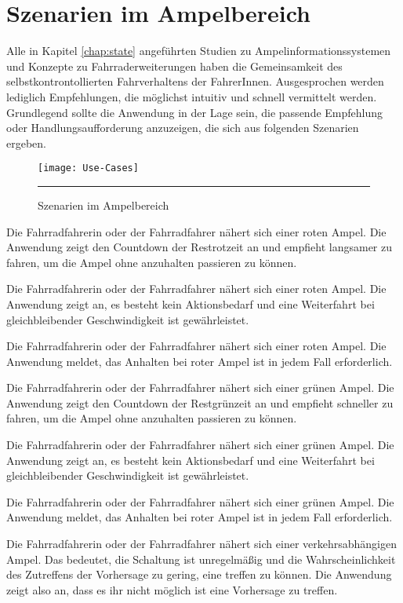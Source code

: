 \chapter{\label{chap:szenarien}Szenarien im Ampelbereich}
Alle in Kapitel \ref{chap:state} angeführten Studien zu Ampelinformationssystemen und Konzepte zu Fahrraderweiterungen haben die Gemeinsamkeit des selbstkontrontollierten Fahrverhaltens der FahrerInnen. Ausgesprochen werden lediglich Empfehlungen, die möglichst intuitiv und schnell vermittelt werden. Grundlegend sollte die Anwendung in der Lage sein, die passende Empfehlung oder Handlungsaufforderung anzuzeigen, die sich aus folgenden Szenarien ergeben.
\begin{figure}[H]  
    \centering  
    \texttt{[image: Use-Cases]} 
    \rule{35em}{0.5pt}
    \caption[Szenarien]{Szenarien im Ampelbereich}
    \label{fig:szenarien}
\end{figure}
\begin{description}[leftmargin=0.7cm,style=nextline]
\item[Szenario R1:] 
Die Fahrradfahrerin oder der Fahrradfahrer nähert sich einer roten Ampel. Die Anwendung zeigt den Countdown der Restrotzeit an und empfieht langsamer zu fahren, um die Ampel ohne anzuhalten passieren zu können.  \\
\item[Szenario R2:] 
Die Fahrradfahrerin oder der Fahrradfahrer nähert sich einer roten Ampel. Die Anwendung zeigt an, es besteht kein Aktionsbedarf und eine Weiterfahrt bei gleichbleibender Geschwindigkeit ist gewährleistet. \\
\item[Szenario R3:] 
Die Fahrradfahrerin oder der Fahrradfahrer nähert sich einer roten Ampel. Die Anwendung meldet, das Anhalten bei roter Ampel ist in jedem Fall erforderlich.\\
\item[Szenario G1:] 
Die Fahrradfahrerin oder der Fahrradfahrer nähert sich einer grünen Ampel. Die Anwendung zeigt den Countdown der Restgrünzeit an und empfieht schneller zu fahren, um die Ampel ohne anzuhalten passieren zu können.\\
\item[Szenario G2:] 
Die Fahrradfahrerin oder der Fahrradfahrer nähert sich einer grünen Ampel. Die Anwendung zeigt an, es besteht kein Aktionsbedarf und eine Weiterfahrt bei gleichbleibender Geschwindigkeit ist gewährleistet.\\ 
\item[Szenario G3:] 
Die Fahrradfahrerin oder der Fahrradfahrer nähert sich einer grünen Ampel. Die Anwendung meldet, das Anhalten bei roter Ampel ist in jedem Fall erforderlich.
\item[Szenario V1:] 
Die Fahrradfahrerin oder der Fahrradfahrer nähert sich einer verkehrsabhängigen Ampel. Das bedeutet, die Schaltung ist unregelmäßig und die Wahrscheinlichkeit des Zutreffens der Vorhersage zu gering, eine treffen zu können. Die Anwendung zeigt also an, dass es ihr nicht möglich ist eine Vorhersage zu treffen.\\ 
\end{description} \vspace{27pt}

